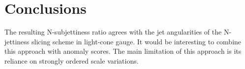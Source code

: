 \section{Conclusions}\label{sec:conclusions}

The resulting N-subjettiness ratio agrees with the jet angularities of
the N-jettiness slicing scheme in light-cone gauge. It would be
interesting to combine this approach with anomaly scores. The main
limitation of this approach is its reliance on strongly ordered scale
variations.

